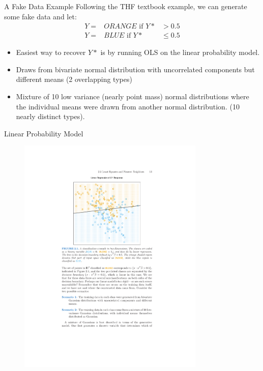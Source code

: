 \documentclass[11pt,handout,xcolor=pdftex,dvipsnames,table,mathserif,aspectratio=169]{beamer}
\begin{document}
\begin{frame}{A Fake Data Example}
Following the THF textbook example, we can generate some fake data and let: 
\begin{eqnarray*}
Y=&ORANGE \mbox{ if } Y* &> 0.5 \\
Y=&BLUE  \mbox{ if }   Y* &\leq 0.5
\end{eqnarray*}
\begin{itemize}
\item Easiest way to recover $Y*$ is by running OLS on the linear probability model.
\item Draws from bivariate normal distribution with uncorrelated components but different means (2 overlapping types)
\item Mixture of 10 low variance (nearly point mass) normal distributions where the individual means were drawn from another normal distribution. (10 nearly distinct types).
\end{itemize}
\end{frame}

\begin{frame}{Linear Probability Model}
\begin{figure}[htbp]
\begin{center}
\includegraphics[width=3.5in]{./resources/classifierOLS.pdf}
\label{classOLS}
\end{center}
\end{figure}
\end{frame}
\end{document}
